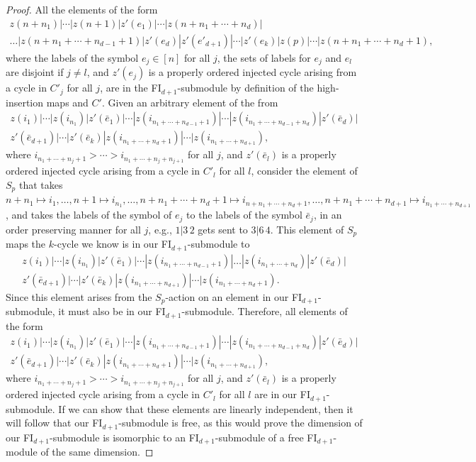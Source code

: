 \documentclass[12py]{amsart}%
\theoremstyle{definition}\newtheorem{definition}[thm]{Definition}
\theoremstyle{definition}
\begin{document}
\begin{proof}
All the elements of the form
\begin{multline*}
z(n+n_{1})|\cdots|z(n+1)|z'(e_{1})|\cdots|z(n+n_{1}+\cdots+n_{d})|\\\dots|z(n+n_{1}+\cdots+n_{d-1}+1)|z'(e_{d})|z'(e'_{d+1})|\cdots|z'(e_{k})|z(p)|\cdots|z(n+n_{1}+\cdots+n_{d}+1),
\end{multline*}
where the labels of the symbol $e_{j}\in [n]$ for all $j$, the sets of labels for $e_{j}$ and $e_{l}$ are disjoint if $j\neq l$, and $z'(e_{j})$ is a properly ordered injected cycle arising from a cycle in $C'_{j}$ for all $j$, are in the FI$_{d+1}$-submodule by definition of the high-insertion maps and $C'$. Given an arbitrary element of the from
\begin{multline*}
z(i_{1})|\cdots|z(i_{n_{1}})|z'(\bar{e}_{1})|\cdots|z(i_{n_{1}+\cdots+n_{d-1}+1})|\cdots|z(i_{n_{1}+\cdots+n_{d-1}+n_{d}})|z'(\bar{e}_{d})|\\
z'(\bar{e}_{d+1})|\cdots|z'(\bar{e}_{k})|z(i_{n_{1}+\cdots+n_{d}+1})|\cdots|z(i_{n_{1}+\cdots+n_{d+1}}),
\end{multline*}
where $i_{n_{1}+\cdots+n_{j}+1}>\cdots>i_{n_{1}+\cdots+n_{j}+n_{j+1}}$ for all $j$, and $z'(\bar{e}_{l})$ is a properly ordered injected cycle arising from a cycle in $C'_{l}$ for all $l$, consider the element of $S_{p}$ that takes $n+n_{1}\mapsto i_{1}, \dots, n+1\mapsto i_{n_{1}}, \dots, n+n_{1}+\cdots+n_{d}+1 \mapsto i_{n+n_{1}+\cdots+n_{d}+1},\dots, n+n_{1}+\cdots+n_{d+1}\mapsto i_{n_{1}+\cdots+n_{d+1}}$, and takes the labels of the symbol of $e_{j}$ to the labels of the symbol $\bar{e}_{j}$, in an order preserving manner for all $j$, e.g., $1|3\,2$ gets sent to $3|6\,4$. This element of $S_{p}$ maps the $k$-cycle we know is in our FI$_{d+1}$-submodule to 
\begin{multline*}
z(i_{1})|\cdots|z(i_{n_{1}})|z'(\bar{e}_{1})|\cdots|z(i_{n_{1}+\cdots+n_{d-1}+1})|\dots|z(i_{n_{1}+\cdots+n_{d}})|z'(\bar{e}_{d})|\\
z'(\bar{e}_{d+1})|\cdots|z'(\bar{e}_{k})|z(i_{n_{1}+\cdots+n_{d+1}})|\cdots|z(i_{n_{1}+\cdots+n_{d}+1}).
\end{multline*}
Since this element arises from the $S_{p}$-action on an element in our FI$_{d+1}$-submodule, it must also be in our FI$_{d+1}$-submodule. Therefore, all elements of the form 
\begin{multline*}
z(i_{1})|\cdots|z(i_{n_{1}})|z'(\bar{e}_{1})|\cdots|z(i_{n_{1}+\cdots+n_{d-1}+1})|\cdots|z(i_{n_{1}+\cdots+n_{d-1}+n_{d}})|z'(\bar{e}_{d})|\\
z'(\bar{e}_{d+1})|\cdots|z'(\bar{e}_{k})|z(i_{n_{1}+\cdots+n_{d}+1})|\cdots|z(i_{n_{1}+\cdots+n_{d+1}}),
\end{multline*}
where $i_{n_{1}+\cdots+n_{j}+1}>\cdots>i_{n_{1}+\cdots+n_{j}+n_{j+1}}$ for all $j$, and $z'(\bar{e}_{l})$ is a properly ordered injected cycle arising from a cycle in $C'_{l}$ for all $l$ are in our FI$_{d+1}$-submodule. If we can show that these elements are linearly independent, then it will follow that our FI$_{d+1}$-submodule is free, as this would prove the dimension of our FI$_{d+1}$-submodule is isomorphic to an FI$_{d+1}$-submodule of a free FI$_{d+1}$-module of the same dimension.


\end{proof}
\end{document}
